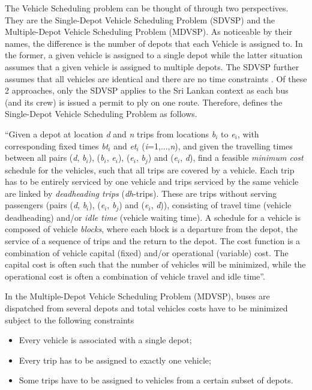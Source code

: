 \documentclass[12pt, oneside]{report}
\begin{document}
The Vehicle Scheduling problem can be thought of through two perspectives. They are the Single-Depot Vehicle Scheduling Problem (SDVSP) and the Multiple-Depot Vehicle Scheduling Problem (MDVSP). As noticeable by their names, the difference is the number of depots that each Vehicle is assigned to. In the former, a given vehicle is assigned to a single depot while the latter situation assumes that a given vehicle is assigned to multiple depots. The SDVSP further assumes that all vehicles are identical and there are no time constraints \citep{Huisman2004}. Of these 2 approaches, only the SDVSP applies to the Sri Lankan context as each bus (and its crew) is issued a permit to ply on one route. Therefore, \citet{Freling2003} defines the Single-Depot Vehicle Scheduling Problem as follows.

“Given a depot at location \textit{d} and \textit{n} trips from locations \textit{b}$_i$ to \textit{e}$_i$, with corresponding fixed times \textit{bt}$_i$ and \textit{et}$_i$ (\textit{i}=1,...,\textit{n}),  and  given  the  travelling  times  between  all  pairs (\textit{d}, \textit{b}$_i$), (\textit{b}$_i$, \textit{e}$_i$), (\textit{e}$_i$, \textit{b}$_j$) and (\textit{e}$_i$, \textit{d}), find a feasible \textit{minimum cost} schedule for the vehicles, such that all trips are covered by a vehicle. Each trip has to be entirely serviced by one vehicle and trips serviced by the same vehicle are linked by \textit{deadheading trips} (\textit{dh}-trips).  These are trips without serving passengers (pairs (\textit{d}, \textit{b}$_i$), (\textit{e}$_i$, \textit{b}$_j$) and (\textit{e}$_i$, \textit{d})), consisting of travel time (vehicle deadheading) and/or \textit{idle time} (vehicle waiting time). A schedule for a vehicle is composed of vehicle \textit{blocks}, where each block is a departure from the depot, the service of a sequence of trips and the return to the depot. The cost function is a combination of vehicle capital (fixed) and/or operational (variable) cost. The capital cost is often such that the number of vehicles will be minimized, while the operational cost is often a combination of vehicle travel and idle time”.

In the Multiple-Depot Vehicle Scheduling Problem (MDVSP), buses are dispatched from several depots and total vehicles costs have to be minimized subject to the following constraints \citep{Huisman2004}

\begin {itemize}
\item Every vehicle is associated with a single depot; 
\item Every trip has to be assigned to exactly one vehicle; 
\item Some trips have to be assigned to vehicles from a certain subset of depots.
\end {itemize}
\end{document}
